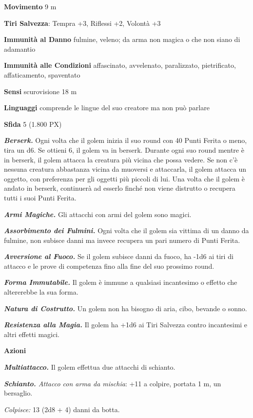 \begin{multicols}{2}
\textbf{Movimento} 9 m

\textbf{Tiri Salvezza}: Tempra +3, Riflessi +2, Volontà +3

\textbf{Immunità al Danno} fulmine, veleno; da arma non magica o che non siano di adamantio

\textbf{Immunità alle Condizioni} affascinato, avvelenato, paralizzato, pietrificato, affaticamento, spaventato

\textbf{Sensi} scurovisione 18 m

\textbf{Linguaggi} comprende le lingue del suo creatore ma non può
parlare

\textbf{Sfida} 5 (1.800 PX)

\textit{\textbf{Berserk.}} Ogni volta che il golem inizia il suo round con 40 Punti Ferita o meno, tira un d6. Se ottieni 6, il golem va in berserk. Durante ogni suo round mentre è in berserk, il golem attacca la creatura più vicina che possa vedere. Se non c'è nessuna creatura abbastanza vicina da muoversi e attaccarla, il golem attacca un oggetto, con preferenza per gli oggetti più piccoli di lui. Una volta che il golem è andato in berserk, continuerà ad esserlo finché non viene distrutto o recupera tutti i suoi Punti Ferita.

\textit{\textbf{Armi Magiche.}} Gli attacchi con armi del golem sono magici.

\textit{\textbf{Assorbimento dei Fulmini.}} Ogni volta che il golem sia vittima di un danno da fulmine, non subisce danni ma invece recupera un pari numero di Punti Ferita.

\textit{\textbf{Avversione al Fuoco.}} Se il golem subisce danni da fuoco, ha -1d6 ai tiri di attacco e le prove di competenza fino alla fine del suo prossimo round.

\textit{\textbf{Forma Immutabile.}} Il golem è immune a qualsiasi incantesimo o effetto che altererebbe la sua forma.

\textit{\textbf{Natura di Costrutto.}} Un golem non ha bisogno di aria, cibo, bevande o sonno.

\textit{\textbf{Resistenza alla Magia.}} Il golem ha +1d6 ai Tiri Salvezza contro incantesimi e altri effetti magici.

\textbf{Azioni}

\textit{\textbf{Multiattacco.}} Il golem effettua due attacchi di schianto.

\textit{\textbf{Schianto.} Attacco con arma da mischia}: +11 a colpire, portata 1 m, un bersaglio.

\textit{Colpisce:} 13 (2d8 + 4) danni da botta.


\end{multicols}
